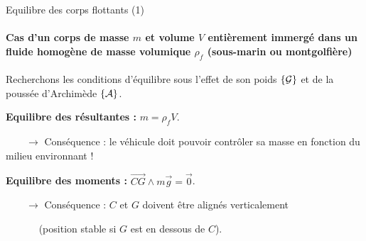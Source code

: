 \begin{frame}{Equilibre des corps flottants (1)}

\small
\paragraph{\bf Cas d'un corps de masse $m$ et volume $V$ entièrement immergé dans un fluide homogène de masse volumique 
$\rho_f$ (sous-marin ou montgolfière) } 

\medskip

Recherchons les conditions d'équilibre sous l'effet de son poids $\left\{ {\cal G} \right\}$ et de la poussée d'Archimède $\left\{ {\cal A} \right\} $.

\medskip \pause 

{\bf Equilibre des résultantes :} $ m = \rho_f V$.

$ \qquad \rightarrow$ Conséquence : le véhicule doit pouvoir contrôler sa masse en fonction du milieu environnant !

\smallskip \pause

{\bf Equilibre des moments :} $ \overrightarrow{CG} \wedge m \vec g = \vec{0}$.

$ \qquad \rightarrow$ Conséquence : $C$ et $G$ doivent être alignés verticalement 

$\qquad \quad$ (position stable si $G$ est en dessous de $C$).



\end{frame}



